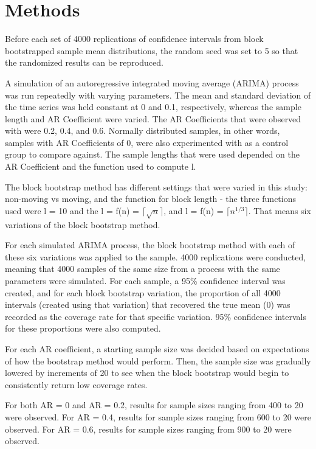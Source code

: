 \documentclass[12pt, letterpaper, titlepage]{article}
\begin{document}
\section{Methods}
\label{sec:methods}

Before each set of 4000 replications of confidence intervals from block bootstrapped sample mean distributions, the random seed was set to 5 so that the randomized results can be 
reproduced. 

A simulation of an autoregressive integrated moving average (ARIMA) process was run 
repeatedly with varying parameters. 
The mean and standard deviation of the time series was held constant at 0 and 0.1, respectively, whereas 
the sample length and AR Coefficient
 were varied. The AR Coefficients that were observed with were 0.2, 0.4, and 0.6. Normally distributed samples, in other words, samples with AR Coefficients of 0, were also experimented with as a control group to compare against. The sample lengths 
 that were used depended on the AR
 Coefficient and the function used to compute l. 
 
 The block bootstrap method has different settings that were varied in this study: 
 non-moving vs moving, and the function for block length - the three functions used were l = 10 and 
the l = f(n) = $\lceil \sqrt{n} \rceil$, and l = f(n) = $\lceil n^{1/3} \rceil$. That means six variations of the block bootstrap method. 

For each simulated ARIMA process, the block bootstrap method with each of these six variations was applied to the sample. 4000 replications were conducted, meaning that 4000 samples of the same size from a process with the same parameters were simulated. For each sample, a 95\% confidence interval was created, and for each block bootstrap variation, the proportion of all 4000 intervals (created using that variation) that recovered the true mean (0) was recorded as the coverage
 rate for that specific variation. 95\% confidence intervals for these proportions were also computed.
 
For each AR coefficient, a starting sample size was decided based on expectations of how the bootstrap method would perform. Then, the sample size was gradually lowered by increments of 20 to see when
the block bootstrap would begin to consistently return low coverage rates. 

For both AR = 0 and AR = 0.2, results for sample sizes ranging from 400 to 20 were observed. For AR = 0.4, results for sample sizes ranging from 600 to 20 were observed. For AR = 0.6, results for sample sizes ranging from 900 to 20 were observed.
\end{document}
